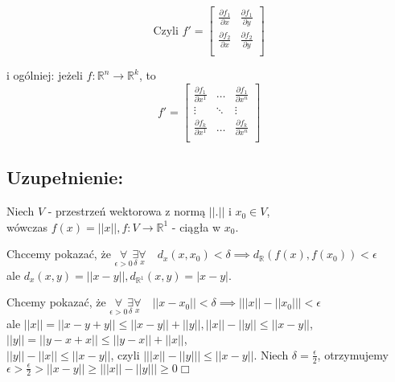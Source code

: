 \documentclass[../main.tex]{subfiles}
\begin{document}
$$\text{Czyli } f' = \left [ \begin{matrix}
\frac{\partial f_1}{\partial x}     &\frac{\partial f_1}{\partial y}\\
\frac{\partial f_2}{\partial x}     &\frac{\partial f_2}{\partial y}\\
\end{matrix}\right ] $$

i ogólniej: jeżeli $f: \mathbb{R}^n \to \mathbb{R}^k$, to \\
$$f' = \left [ \begin{matrix}
    \frac{\partial f_1}{\partial x^1}   &\dots   &\frac{\partial f_1}{\partial x^n}\\
    \vdots                              &\ddots  &\vdots\\
    \frac{\partial f_k}{\partial x^1}   &\dots   &\frac{\partial f_k}{\partial x^n}\\\end{matrix}\right ] $$

\subsection{
    Uzupełnienie:
}

Niech $V$ - przestrzeń wektorowa z normą $||.||$ i $x_0\in V$, \\wówczas $f(x)=||x||, f: V\to\mathbb{R}^1$ - ciągła w $x_0$.

\vspace{0.5cm}
\begin{dowod}
\end{dowod}

Chccemy pokazać, że $\underset{\epsilon > 0}{\forall} \underset{\delta}{\exists} \underset{x}{\forall} \quad d_x (x,x_0) < \delta \implies d_{\mathbb{R}} (f(x),f(x_0)) < \epsilon$\\
ale $d_x(x,y) = ||x-y||, d_{\mathbb{R}^1} (x,y) = |x-y|$.
\vspace{0.3cm}

Chcemy pokazać, że $\underset{\epsilon > 0}{\forall} \underset{\delta}{\exists} \underset{x}{\forall} \quad ||x - x_0|| < \delta \implies \big | ||x|| - ||x_0|| \big | < \epsilon$\\
ale $||x|| = ||x-y+y|| \leq ||x-y|| + ||y||, ||x||-||y||\leq ||x-y||$,\\
$||y|| = ||y-x+x||\leq ||y-x|| + ||x||$,\\
$||y||-||x||\leq ||x-y||$, czyli $\big | ||x|| - ||y|| \big | \leq ||x-y||$. Niech $\delta = \frac{\epsilon}{2}$, otrzymujemy $\epsilon > \frac{\epsilon}{2} > ||x-y|| \geq \big | ||x|| - ||y|| \big | \geq 0 \Box$
\end{document}
